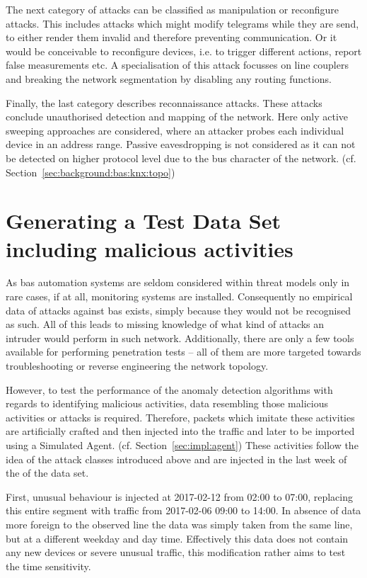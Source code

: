 The next category of attacks can be classified as manipulation or reconfigure attacks. This includes attacks which might modify telegrams while they are send, to either render them invalid and therefore preventing communication. Or it would be conceivable to reconfigure devices, i.e. to trigger different actions, report false measurements etc. A specialisation of this attack focusses on line couplers and breaking the network segmentation by disabling any routing functions.

Finally, the last category describes reconnaissance attacks. These attacks conclude unauthorised detection and mapping of the network. Here only active sweeping approaches are considered, where an attacker probes each individual device in an address range.
Passive eavesdropping is not considered as it can not be detected on higher protocol level due to the bus character of the network. (cf. Section~\ref{sec:background:bas:knx:topo})

\section{Generating a Test Data Set including malicious activities}
\label{sec:methods:gen-test}


As \gls{bas} automation systems are seldom considered within threat models only in rare cases, if at all, monitoring systems are installed.
Consequently no empirical data of attacks against \gls{bas} exists, simply because they would not be recognised as such.
All of this leads to missing knowledge of what kind of attacks an intruder would perform in such network.
Additionally, there are only a few tools available for performing penetration tests -- all of them are more targeted towards troubleshooting or reverse engineering the network topology.

However, to test the performance of the anomaly detection algorithms with regards to identifying malicious activities, data resembling those malicious activities or attacks is required.
Therefore, packets which imitate these activities are artificially crafted and then injected into the traffic and later to be imported using a Simulated Agent. (cf. Section~\ref{sec:impl:agent})
These activities follow the idea of the attack classes introduced above and are injected in the last week of the of the data set.

First, unusual behaviour is injected at 2017-02-12 from 02:00 to 07:00, replacing this entire segment with traffic from 2017-02-06 09:00 to 14:00. In absence of data more foreign to the observed line the data was simply taken from the same line, but at a different weekday and day time. Effectively this data does not contain any new devices or severe unusual traffic, this modification rather aims to test the time sensitivity.

